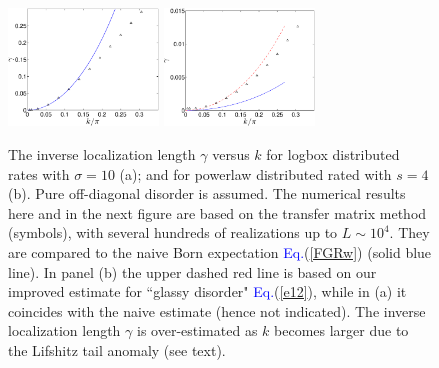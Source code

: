 \documentclass[twocolumn,showpacs,aps,pre]{revtex4-1}
\newcommand{\Eq}[1]{{\textcolor{blue}{Eq.}}(\ref{#1})}
\begin{document}
\begin{figure}

\includegraphics[width=4cm]{gammaVSkBX}
\includegraphics[width=4cm]{gammaVSkPL}



\caption{The inverse localization length $\gamma$ versus $k$ 
for logbox distributed rates with $\sigma=10$ (a);   
and for powerlaw distributed rated with $s=4$ (b).  
Pure off-diagonal disorder is assumed.
The numerical results here and in the next figure 
are based on the transfer matrix method (symbols), 
with several hundreds of realizations up to ${L\sim10^4}$.
They are compared to the naive Born expectation \Eq{FGRw} (solid blue line).
In panel (b) the upper dashed red line is based on our improved 
estimate for ``glassy disorder"  \Eq{e12}, 
while in (a) it coincides with the naive estimate (hence not indicated). 
The inverse localization length $\gamma$ is over-estimated 
as $k$ becomes larger due to the Lifshitz tail anomaly (see text).  
}
\label{f2}
\end{figure}
\end{document}
